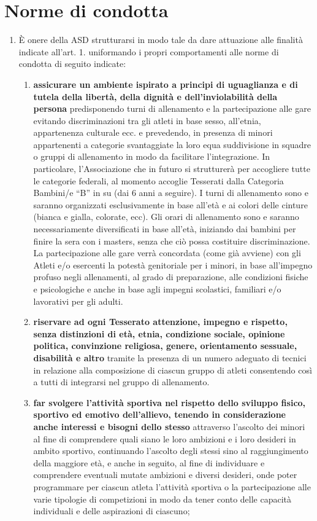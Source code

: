 \documentclass{djtsasddoc}
\begin{document}
	\section{Norme di condotta}
	\begin{enumerate}
		\item È onere della ASD strutturarsi in modo tale da dare attuazione alle finalità indicate all'art. 1. uniformando i propri comportamenti alle norme di condotta di seguito indicate:
		\begin{enumerate}
			\item \textbf{assicurare un ambiente ispirato a principi di uguaglianza e di tutela della libertà, della dignità e dell'inviolabilità della persona} predisponendo turni di allenamento e la partecipazione alle gare evitando discriminazioni tra gli atleti in base sesso, all'etnia, appartenenza culturale ecc. e prevedendo, in presenza di minori appartenenti a categorie svantaggiate la loro equa suddivisione in squadre o gruppi di allenamento in modo da facilitare l'integrazione. In particolare, l'Associazione che in futuro si strutturerà per accogliere tutte le categorie federali, al momento accoglie Tesserati dalla Categoria Bambini/e “B” in su (dai 6 anni a seguire). I turni di allenamento sono e saranno organizzati esclusivamente in base all'età e ai colori delle cinture (bianca e gialla, colorate, ecc). Gli orari di allenamento sono e saranno necessariamente diversificati in base all'età, iniziando dai bambini per finire la sera con i masters, senza che ciò possa costituire discriminazione. La partecipazione alle gare verrà concordata (come già avviene) con gli Atleti e/o esercenti la potestà genitoriale per i minori, in base all'impegno profuso negli allenamenti, al grado di preparazione, alle condizioni fisiche e psicologiche e anche in base agli impegni scolastici, familiari e/o lavorativi per gli adulti. 
			\item \textbf{riservare ad ogni Tesserato attenzione, impegno e rispetto, senza distinzioni di età, etnia, condizione sociale, opinione politica, convinzione religiosa, genere, orientamento sessuale, disabilità e altro} tramite la presenza di un numero adeguato di tecnici in relazione alla composizione di ciascun gruppo di atleti consentendo così a tutti di integrarsi nel gruppo di allenamento.
			\item \textbf{far svolgere l'attività sportiva nel rispetto dello sviluppo fisico, sportivo ed emotivo dell'allievo, tenendo in considerazione anche interessi e bisogni dello stesso} attraverso l'ascolto dei minori al fine di comprendere quali siano le loro ambizioni e i loro desideri in ambito sportivo, continuando l'ascolto degli stessi sino al raggiungimento della maggiore età, e anche in seguito, al fine di individuare e comprendere eventuali mutate ambizioni e diversi desideri, onde poter programmare per ciascun atleta l'attività sportiva o la partecipazione alle varie tipologie di competizioni in modo da tener conto delle capacità individuali e delle aspirazioni di ciascuno;

\end{enumerate}
\end{enumerate}
\end{document}
